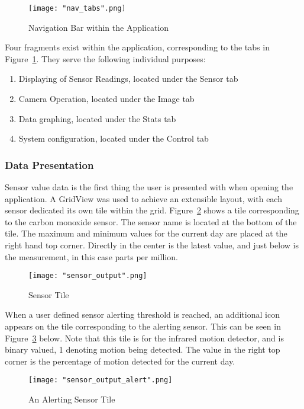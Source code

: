 \documentclass{article}
\begin{document}
\begin{figure}[H]
\centering
\texttt{[image: "nav\_tabs".png]}
\caption{Navigation Bar within the Application}
\label{fig:android_navigation}
\end{figure}

\noindent
Four fragments exist within the application, corresponding to the tabs in Figure~\ref{fig:android_navigation}. They serve the following individual purposes:
\begin{enumerate}
  \item Displaying of Sensor Readings, located under the Sensor tab
  \item Camera Operation, located under the Image tab
  \item Data graphing, located under the Stats tab
  \item System configuration, located under the Control tab
\end{enumerate}	

\subsubsection{Data Presentation}
Sensor value data is the first thing the user is presented with when opening the application. A GridView was used to achieve an extensible layout, with each sensor dedicated its own tile within the grid. Figure~\ref{fig:android_sensor_tile} shows a tile corresponding to the carbon monoxide sensor.  The sensor name is located at the bottom of the tile. The maximum and minimum values for the current day are placed at the right hand top corner. Directly in the center is the latest value, and just below is the measurement, in this case parts per million.
\begin{figure}[H]
\centering
\texttt{[image: "sensor\_output".png]}
\caption{Sensor Tile}
\label{fig:android_sensor_tile}
\end{figure}

\noindent
When a user defined sensor alerting threshold is reached, an additional icon appears on the tile corresponding to the alerting sensor. This can be seen in Figure~\ref{fig:android_sensor_tile_alerting} below. Note that this tile is for the infrared motion detector, and is binary valued, 1 denoting motion being detected. The value in the right top corner is the percentage of motion detected for the current day. 
\begin{figure}[H]
\centering
\texttt{[image: "sensor\_output\_alert".png]}
\caption{An Alerting Sensor Tile }
\label{fig:android_sensor_tile_alerting}
\end{figure}
\end{document}
